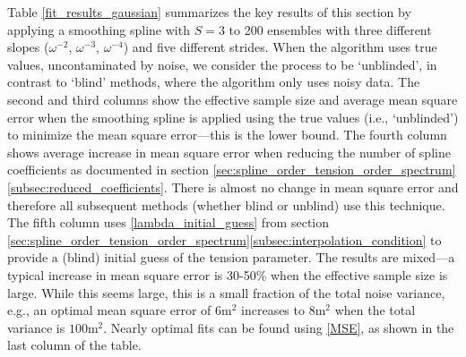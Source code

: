 \documentclass{ametsoc}
\begin{document}
Table \ref{fit_results_gaussian} summarizes the key results of this section by applying a smoothing spline with $S=3$ to 200 ensembles with three different slopes ($\omega^{-2}$, $\omega^{-3}$, $\omega^{-4}$) and five different strides. When the algorithm uses true values, uncontaminated by noise, we consider the process to be `unblinded', in contrast to `blind' methods, where the algorithm only uses noisy data. The second and third columns show the effective sample size and average mean square error when the smoothing spline is applied using the true values (i.e., `unblinded') to minimize the mean square error---this is the lower bound. The fourth column shows average increase in mean square error when reducing the number of spline coefficients as documented in section \ref{sec:spline_order_tension_order_spectrum}\ref{subsec:reduced_coefficients}. There is almost no change in mean square error and therefore all subsequent methods (whether blind or unblind) use this technique. The fifth column uses \eqref{lambda_initial_guess} from section \ref{sec:spline_order_tension_order_spectrum}\ref{subsec:interpolation_condition} to provide a (blind) initial guess of the tension parameter. The results are mixed---a typical increase in mean square error is 30-50\% when the effective sample size is large. While this seems large, this is a small fraction of the total noise variance, e.g., an optimal mean square error of $6$m$^2$ increases to $8$m$^2$ when the total variance is $100$m$^2$. Nearly optimal fits can be found using \eqref{MSE}, as shown in the last column of the table.

\end{document}
